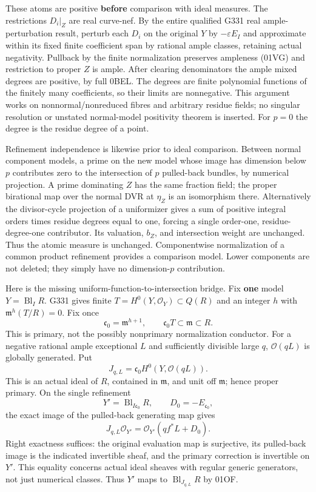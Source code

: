 \documentclass[
]{article}
\begin{document}
These atoms are positive \textbf{before} comparison with ideal measures.
The restrictions \(D_i|_Z\) are real curve-nef. By the entire qualified
G331 real ample-perturbation result, perturb each \(D_i\) on the
original \(Y\) by \(-\varepsilon E_I\) and approximate within its fixed
finite coefficient span by rational ample classes, retaining actual
negativity. Pullback by the finite normalization preserves ampleness
(01VG) and restriction to proper \(Z\) is ample. After clearing
denominators the ample mixed degrees are positive, by full 0BEL. The
degrees are finite polynomial functions of the finitely many
coefficients, so their limits are nonnegative. This argument works on
nonnormal/nonreduced fibres and arbitrary residue fields; no singular
resolution or unstated normal-model positivity theorem is inserted. For
\(p=0\) the degree is the residue degree of a point.

Refinement independence is likewise prior to ideal comparison. Between
normal component models, a prime on the new model whose image has
dimension below \(p\) contributes zero to the intersection of \(p\)
pulled-back bundles, by numerical projection. A prime dominating \(Z\)
has the same fraction field; the proper birational map over the normal
DVR at \(\eta_Z\) is an isomorphism there. Alternatively the
divisor-cycle projection of a uniformizer gives a sum of positive
integral orders times residue degrees equal to one, forcing a single
order-one, residue-degree-one contributor. Its valuation, \(b_Z\), and
intersection weight are unchanged. Thus the atomic measure is unchanged.
Componentwise normalization of a common product refinement provides a
comparison model. Lower components are not deleted; they simply have no
dimension-\(p\) contribution.

Here is the missing uniform-function-to-intersection bridge. Fix
\textbf{one} model \(Y=\operatorname{Bl}_I R\). G331 gives finite
\(T=H^0(Y,\mathcal O_Y)\subset Q(R)\) and an integer \(h\) with
\(\mathfrak m^h(T/R)=0\). Fix once
\[\mathfrak c_0=\mathfrak m^{h+1},\qquad \mathfrak c_0T\subset\mathfrak m\subset R.\]
This is primary, not the possibly nonprimary normalization conductor.
For a negative rational ample exceptional \(L\) and sufficiently
divisible large \(q\), \(\mathcal O(qL)\) is globally generated. Put
\[J_{q,L}=\mathfrak c_0 H^0(Y,\mathcal O(qL)).\] This is an actual ideal
of \(R\), contained in \(\mathfrak m\), and unit off \(\mathfrak m\);
hence proper primary. On the single refinement
\[Y'=\operatorname{Bl}_{I\mathfrak c_0}R,\qquad D_0=-E_{\mathfrak c_0},\]
the exact image of the pulled-back generating map gives
\[J_{q,L}\mathcal O_{Y'}=\mathcal O_{Y'}(qf^*L+D_0).\] Right exactness
suffices: the original evaluation map is surjective, its pulled-back
image is the indicated invertible sheaf, and the primary correction is
invertible on \(Y'\). This equality concerns actual ideal sheaves with
regular generic generators, not just numerical classes. Thus \(Y'\) maps
to \(\operatorname{Bl}_{J_{q,L}}R\) by 01OF.
\end{document}
